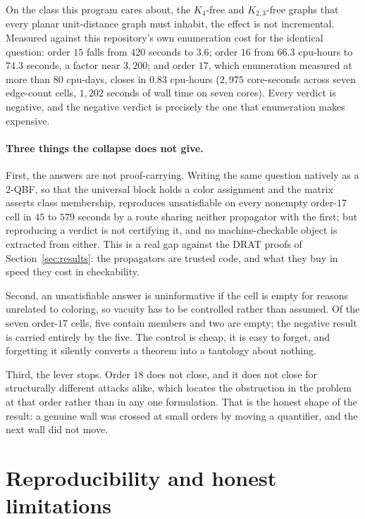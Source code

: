 \documentclass[11pt]{article}
\theoremstyle{definition}
\begin{document}
On the class this program cares about, the $K_4$-free and $K_{2,3}$-free graphs
that every planar unit-distance graph must inhabit, the effect is not
incremental. Measured against this repository's own enumeration cost for the
identical question: order $15$ falls from $420$ seconds to $3.6$; order $16$ from
$66.3$ cpu-hours to $74.3$ seconds, a factor near $3{,}200$; and order $17$, which
enumeration measured at more than $80$ cpu-days, closes in $0.83$ cpu-hours
($2{,}975$ core-seconds across seven edge-count cells, $1{,}202$ seconds of wall
time on seven cores). Every verdict is negative, and the negative verdict is
precisely the one that enumeration makes expensive.

\paragraph{Three things the collapse does not give.} First, the answers are not
proof-carrying. Writing the same question natively as a $2$-QBF, so that the
universal block holds a color assignment and the matrix asserts class membership,
reproduces unsatisfiable on every nonempty order-$17$ cell in $45$ to $579$
seconds by a route sharing neither propagator with the first; but reproducing a
verdict is not certifying it, and no machine-checkable object is extracted from
either. This is a real gap against the DRAT proofs of
Section~\ref{sec:results}: the propagators are trusted code, and what they buy in
speed they cost in checkability.

Second, an unsatisfiable answer is uninformative if the cell is empty for reasons
unrelated to coloring, so vacuity has to be controlled rather than assumed. Of
the seven order-$17$ cells, five contain members and two are empty; the negative
result is carried entirely by the five. The control is cheap, it is easy to
forget, and forgetting it silently converts a theorem into a tautology about
nothing.

Third, the lever stops. Order $18$ does not close, and it does not close for
structurally different attacks alike, which locates the obstruction in the
problem at that order rather than in any one formulation. That is the honest
shape of the result: a genuine wall was crossed at small orders by moving a
quantifier, and the next wall did not move.

\section{Reproducibility and honest limitations}
\label{sec:repro}
\end{document}
